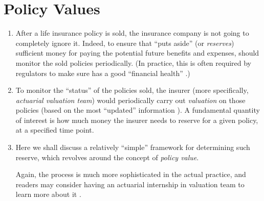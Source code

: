 \section{Policy Values}
\label{sect:policy-values}
\begin{enumerate}
\item After a life insurance policy  is sold, the insurance
company  is not going to completely ignore it. Indeed, to
ensure that  ``puts aside'' (or \emph{reserves}) sufficient
money  for paying the potential future benefits and expenses,
 should monitor  the sold policies
 periodically. (In practice, this is often required by
regulators  to make sure  has a good
``financial health'' .)

\item To monitor the ``status''  of the policies sold, the insurer
 (more specifically, \emph{actuarial valuation team}) would
periodically carry out \emph{valuation} on those policies (based on the most
``updated'' information ). A fundamental quantity of interest is
how much money  the insurer  needs to reserve
for a given policy, at a specified time point.

\item Here we shall discuss a relatively ``simple'' framework for determining
such reserve, which revolves around the concept of \emph{policy value}.

\begin{note}
Again, the process is much more sophisticated in the actual practice, and
readers may consider having an actuarial internship in valuation team to learn
more about it .
\end{note}
\end{enumerate}

